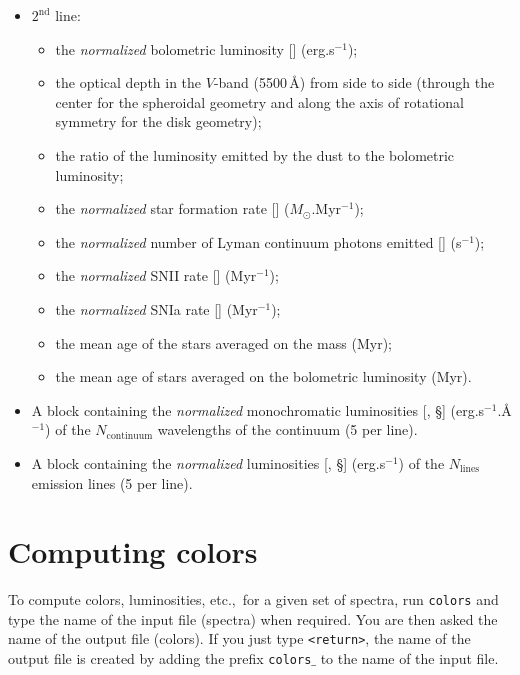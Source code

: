 \documentclass[11pt,draft,fleqn]{article}
\begin{document}
\begin{itemize}
\begin{itemize}
\begin{itemize}
\end{itemize}
\item $2^{\mathrm{nd}}$ line:
\begin{itemize}
\item the \emph{normalized} bolometric luminosity [\dag] (erg.s$^{-1}$);
\item the optical depth in the $V$-band (5500\,\AA) from side to side (through the
center for the spheroidal geometry and along the axis of rotational
symmetry for the disk geometry);
\item the ratio of the luminosity emitted by the dust to the bolometric luminosity;
\item the \emph{normalized} star formation rate [\dag] ($M_{\odot}$.Myr$^{-1}$);
\item the \emph{normalized} number of Lyman continuum photons emitted
[\dag] (s$^{-1}$);
\item the \emph{normalized} SNII rate [\dag] (Myr$^{-1}$);
\item the \emph{normalized} SNIa rate [\dag] (Myr$^{-1}$);
\item the mean age of the stars averaged on the mass (Myr);
\item the mean age of stars averaged on the bolometric luminosity (Myr).
\end{itemize}
\item A block containing the \emph{normalized} monochromatic 
luminosities [\dag, \S] (erg.s$^{-1}$.\AA$^{-1}$)
of the $N_{\mathrm{continuum}}$
wavelengths of the continuum (5 per line).
\item A block containing the \emph{normalized} luminosities [\dag, \S]
(erg.s$^{-1}$) of the $N_{\mathrm{lines}}$ emission lines (5 per line).
\end{itemize}
\end{itemize}
\section{Computing colors}
To compute colors, luminosities, etc.,\ for a given set of spectra, 
run \texttt{colors}
and type the name of the input file (spectra) when required. 
You are then asked the name of the output file
(colors). If you just type \texttt{<return>}, the name of the output file
is created by adding the prefix \texttt{colors$\_$} to the name of 
the input file.
\end{document}

